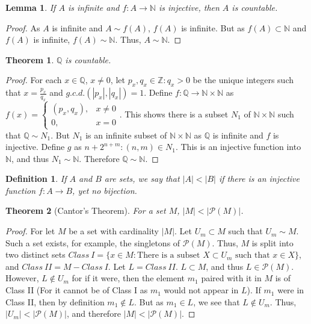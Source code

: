 \documentclass[12pt,oneside]{book}
\theoremstyle{mystyle}
\newtheorem{theorem}{Theorem}[section]
\newtheorem{definition}{Definition}[section]
\newtheorem{lemma}{Lemma}[section]
\begin{document}
\begin{lemma}
If $A$ is infinite and $f:A\rightarrow \mathbb{N}$ is injective, then $A$ is countable.
\end{lemma}
\begin{proof}
As $A$ is infinite and $A\sim f(A)$, $f(A)$ is infinite. But as $f(A)\subset \mathbb{N}$ and $f(A)$ is infinite, $f(A)\sim \mathbb{N}$. Thus, $A\sim \mathbb{N}$. 
\end{proof}

\begin{theorem}
$\mathbb{Q}$ is countable.
\end{theorem}
\begin{proof}
For each $x\in \mathbb{Q}$, $x\ne 0$, let $p_x,q_x\in\mathbb{Z}:q_x>0$ be the unique integers such that $x = \frac{p_x}{q_x}$ and $g.c.d.(|p_x|,|q_x|)=1$. Define $f:\mathbb{Q}\rightarrow \mathbb{N}\times \mathbb{N}$ as $f(x) = \begin{cases}(p_x,q_x), & x\ne 0 \\ 0, & x=0\end{cases}$. This shows there is a subset $N_1$ of $\mathbb{N}\times \mathbb{N}$ such that $\mathbb{Q}\sim N_1$. But $N_1$ is an infinite subset of $\mathbb{N}\times\mathbb{N}$ as $\mathbb{Q}$ is infinite and $f$ is injective. Define $g$ as $n+2^{n+m}:(n,m)\in N_1$. This is an injective function into $\mathbb{N}$, and thus $N_1 \sim \mathbb{N}$. Therefore $\mathbb{Q}\sim \mathbb{N}$.
\end{proof}

\begin{definition}
If $A$ and $B$ are sets, we say that $|A|<|B|$ if there is an injective function $f:A\rightarrow B$, yet no bijection.
\end{definition}

\begin{theorem}[Cantor's Theorem]
For a set $M$, $|M|<|\mathcal{P}(M)|$.
\end{theorem}
\begin{proof}
For let $M$ be a set with cardinality $|M|$. Let $U_m \subset M$ such that $U_m \sim M$. Such a set exists, for example, the singletons of $\mathcal{P}(M)$. Thus, $M$ is split into two distinct sets $Class\ I=\{x\in M: \textrm{There is a subset } X\subset U_m\textrm{ such that }x\in X\}$, and $Class\ II=M-Class\ I$. Let $L = Class\ II$. $L\subset M$, and thus $L\in \mathcal{P}(M)$. However, $L \notin U_m$ for if it were, then the element $m_1$ paired with it in $M$ is of Class II (For it cannot be of Class I as $m_1$ would not appear in $L$). If $m_1$ were in Class II, then by definition $m_1 \notin L$. But as $m_1 \in L$, we see that $L\notin U_m$. Thus, $|U_m| <|\mathcal{P}(M)|$, and therefore $|M|<|\mathcal{P}(M)|$.
\end{proof}
\end{document}
